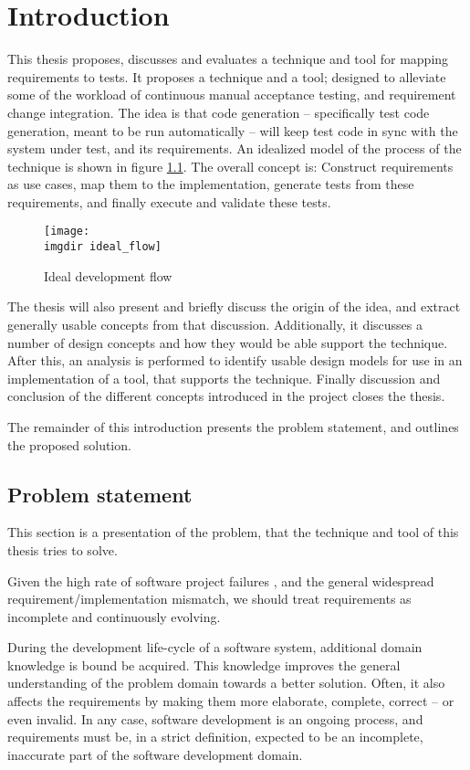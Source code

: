 \chapter{Introduction}
This thesis proposes, discusses and evaluates a technique and tool for mapping requirements to tests. It proposes a technique and a tool; designed to alleviate some of the workload of continuous manual acceptance testing, and requirement change integration. The idea is that code generation -- specifically test code generation, meant to be run automatically -- will keep test code in sync with the system under test, and its requirements.  An idealized model of the process of the technique is shown in figure \ref{fig:ideal_flow}. The overall concept is: Construct requirements as use cases, map them to the implementation, generate tests from these requirements, and finally execute and validate these tests.\medskip

\begin{figure}[!htbp]
\centering
\texttt{[image: \\imgdir ideal\_flow]}
\caption{Ideal development flow}
\label{fig:ideal_flow}
\end{figure}

\noindent
The thesis will also present and briefly discuss the origin of the idea, and extract generally usable concepts from that discussion. Additionally, it discusses a number of design concepts and how they would be able support the technique. After this, an analysis is performed to identify usable design models for use in an implementation of a tool, that supports the technique. Finally discussion and conclusion of the different concepts introduced in the project closes the thesis.\medskip

\noindent
The remainder of this introduction presents the problem statement, and outlines the proposed solution.

\section{Problem statement}
This section is a presentation of the problem, that the technique and tool of this thesis tries to solve.\medskip

\noindent
Given the high rate of software project failures\cite{verner2008} \cite{charette2005}, and the general widespread requirement/implementation mismatch, we should treat requirements as incomplete and continuously evolving.\medskip

During the development life-cycle of a software system, additional domain knowledge is bound be acquired. This knowledge improves the general understanding of the problem domain towards a better solution. Often, it also affects the requirements by making them more elaborate, complete, correct -- or even invalid. In any case, software development is an ongoing process, and requirements must be, in a strict definition, expected to be an incomplete, inaccurate part of the software development domain.\medskip

